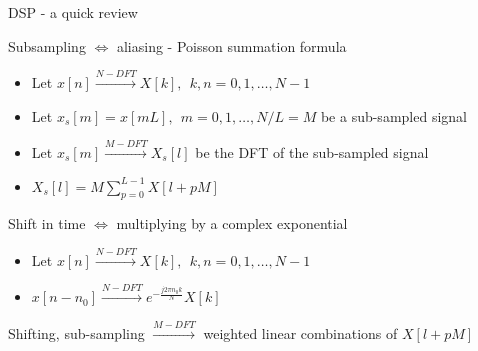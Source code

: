 \documentclass[10pt,xcolor=table]{beamer}
\begin{document}
\begin{frame}{DSP - a quick review}
\begin{block}{Subsampling $\Leftrightarrow$ aliasing - Poisson summation formula}
\begin{itemize}
  \item Let $x[n] \xrightarrow{N-DFT} X[k] , \ \ k,n = 0,1, \ldots,N-1$
  \item Let $x_{s}[m]  = x[mL] , \ \ m = 0,1, \ldots, N/L=M$ be a sub-sampled signal
  \item Let $x_s[m] \xrightarrow{M-DFT} X_s[l]$ be the DFT of the sub-sampled signal
  \item $\boxed{X_s[l] = M\sum\limits_{p=0}^{L-1}X[l+pM]}$
\end{itemize}
\end{block}
\pause
\begin{block}{Shift in time $\Leftrightarrow$ multiplying by a complex exponential}
\begin{itemize}
  \item Let $x[n] \xrightarrow{N-DFT} X[k] , \ \ k,n = 0,1, \ldots,N-1$
  \item $x[n-n_0] \xrightarrow{N-DFT} e^{-\frac{j 2 \pi n_0 k}{N}} X[k]$
\end{itemize}
\end{block}
\pause
Shifting, sub-sampling $\xrightarrow{M-DFT}$ weighted linear combinations of $X[l+pM]$
\end{frame}
\end{document}
